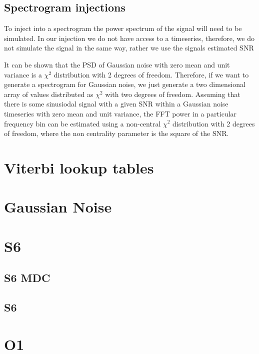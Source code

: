 \subsection{Spectrogram injections}

To inject into a spectrogram the power spectrum of the signal will need to be simulated. In our injection we do not have access to a timeseries, therefore, we do not simulate the signal in the same way, rather we use the signals estimated \ac{SNR}

It can be shown that the \ac{PSD} of Gaussian noise with zero mean and unit variance is a $\chi^2$ distribution with 2 degrees of freedom. Therefore, if we want to generate a spectrogram for Gaussian noise, we just generate a two dimensional array of values distributed as $\chi^2$ with two degrees of freedom.
Assuming that there is some sinusiodal signal with a given \ac{SNR} within a Gaussian noise timeseries with zero mean and unit variance, the \ac{FFT} power in a particular frequency bin can be estimated using a non-central $\chi^2$ distribution with 2 degrees of freedom, where the non centrality parameter is the square of the \ac{SNR}. 

\section{Viterbi lookup tables}


\section{Gaussian Noise}

\section{S6}

\subsection{S6 MDC}

\subsection{S6}

\section{O1}

